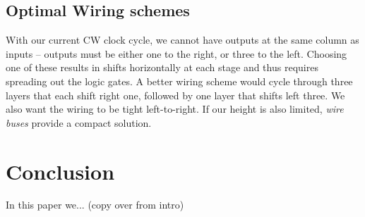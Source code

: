 \documentclass[letterpaper, 10 pt, conference]{ieeeconf}
\newcommand{\todo}[1]{\vspace{5 mm}\par \noindent \framebox{\begin{minipage}[c]{0.98 \columnwidth} \ttfamily\flushleft \textcolor{red}{#1}\end{minipage}}\vspace{5 mm}\par}
\begin{document}
\todo{These are comparable to a ripple-carry adder:  the delay for $n$ bits is  and requires $x=$ gates.
Numerous other schemes exist to speed up the computation.  The advantage of gates is that they are easily reused and connected.  If speed was critical, instead of using discrete gates, we could engineer the workspace to directly compute logic.  }

\subsection{Optimal Wiring schemes}\label{sec:wiring}
With our current CW clock cycle, we cannot have outputs at the same column as inputs -- outputs must be either one to the right, or three to the left.  Choosing one of these results in shifts horizontally at each stage and thus requires spreading out the logic gates. A better wiring scheme would cycle through three layers that each shift right one, followed by one layer that shifts left three.  We also want the wiring to be tight left-to-right.  If our height is also limited, \emph{wire buses} provide a compact solution. 

\section{Conclusion}\label{sec:Conclusion}
In this paper we... (copy over from intro)

    
   


\newpage    
    
\end{document}
